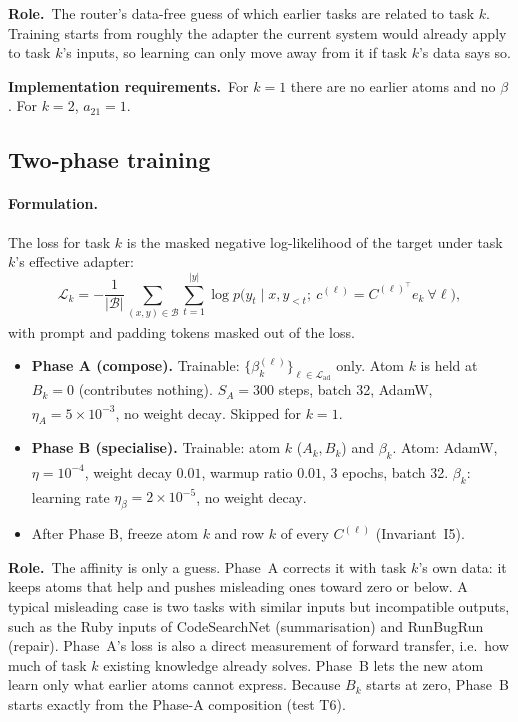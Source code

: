 \documentclass[11pt]{article}
\newcommand{\T}{^{\top}}
\newcommand{\tagthesis}{\textsuperscript{\textcolor{teal!70!black}{\sffamily[thesis]}}}
\newcommand{\tagnew}{\textsuperscript{\textcolor{orange!80!black}{\sffamily[new]}}}
\newcommand{\Ladapt}{\mathcal{L}_{\mathrm{ad}}}
\newcommand{\role}{\par\noindent\textbf{Role.}\ }
\newcommand{\impl}{\par\noindent\textbf{Implementation requirements.}\ }
\begin{document}
\role The router's data-free guess of which earlier tasks are related to task $k$. Training starts from roughly
the adapter the current system would already apply to task $k$'s inputs, so learning can only move away from it
if task $k$'s data says so.

\impl For $k=1$ there are no earlier atoms and no $\beta$. For $k=2$, $a_{21}=1$.

\subsection{Two-phase training}\label{sec:train}

\paragraph{Formulation.} The loss for task $k$ is the masked negative log-likelihood of the target under task
$k$'s effective adapter:
\begin{equation}
  \mathcal L_k=-\frac{1}{|\mathcal B|}\sum_{(x,y)\in\mathcal B}\sum_{t=1}^{|y|}\log p\big(y_t\mid x,y_{<t};\ c^{(\ell)}=C^{(\ell)\T}e_k\ \forall\ell\big),
\end{equation}
with prompt and padding tokens masked out of the loss\tagthesis.
\begin{itemize}[leftmargin=*]
  \item \textbf{Phase A (compose).} Trainable: $\{\beta^{(\ell)}_k\}_{\ell\in\Ladapt}$ only. Atom $k$ is held at
        $B_k=0$ (contributes nothing). $S_A=300$ steps, batch 32, AdamW, $\eta_A=5\times10^{-3}$, no weight decay\tagnew.
        Skipped for $k=1$.
  \item \textbf{Phase B (specialise).} Trainable: atom $k$ ($A_k,B_k$) and $\beta_k$. Atom: AdamW,
        $\eta=10^{-4}$, weight decay $0.01$, warmup ratio $0.01$, 3 epochs, batch 32\tagthesis.
        $\beta_k$: learning rate $\eta_\beta=2\times10^{-5}$, no weight decay\tagnew.
  \item After Phase B, freeze atom $k$ and row $k$ of every $C^{(\ell)}$ (Invariant~I5).
\end{itemize}

\role The affinity is only a guess. Phase~A corrects it with task $k$'s own data: it keeps atoms that help and
pushes misleading ones toward zero or below. A typical misleading case is two tasks with similar inputs but
incompatible outputs, such as the Ruby inputs of CodeSearchNet (summarisation) and RunBugRun (repair). Phase~A's
loss is also a direct measurement of forward transfer, i.e.\ how much of task $k$ existing knowledge already
solves. Phase~B lets the new atom learn only what earlier atoms cannot express. Because $B_k$ starts at zero,
Phase~B starts exactly from the Phase-A composition (test T6).
\end{document}
